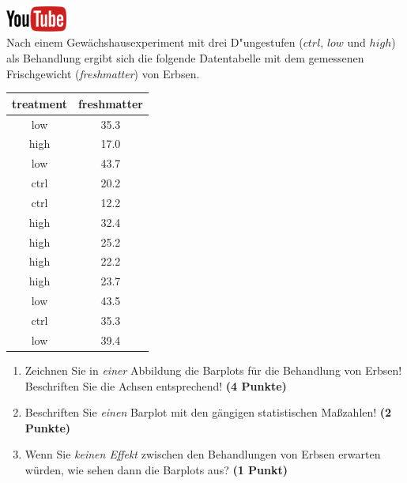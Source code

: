 \documentclass[a4paper, 10pt]{scrartcl}\usepackage[]{graphicx}\usepackage[]{xcolor}
\begin{document}
\hfill\href{https://youtu.be/vXnLttRL_VI}{\includegraphics[width =
  2cm]{img/youtube}}\\[1Ex]



Nach einem Gew{\"a}chshausexperiment mit drei D{"u}ngestufen ($ctrl$, $low$ und $high$) als Behandlung 
ergibt sich die folgende Datentabelle mit dem gemessenen Frischgewicht
(\textit{freshmatter}) von Erbsen.

\begin{table}[!h]
\centering
\begin{tabular}{cc}
\toprule
treatment & freshmatter\\
\midrule
low & 35.3\\
high & 17.0\\
low & 43.7\\
ctrl & 20.2\\
ctrl & 12.2\\
\addlinespace
high & 32.4\\
high & 25.2\\
high & 22.2\\
high & 23.7\\
low & 43.5\\
\addlinespace
ctrl & 35.3\\
low & 39.4\\
\bottomrule
\end{tabular}
\end{table}



\begin{enumerate}
\item Zeichnen Sie in \textit{einer} Abbildung die Barplots f{\"u}r die
  Behandlung von Erbsen! Beschriften Sie die Achsen entsprechend!
  \textbf{(4 Punkte)}
\item Beschriften Sie \textit{einen} Barplot mit den g{\"a}ngigen
  statistischen Ma{\ss}zahlen! \textbf{(2 Punkte)}
\item Wenn Sie \textit{keinen Effekt} zwischen den Behandlungen von
  Erbsen erwarten w{\"u}rden, wie sehen dann die Barplots aus?
  \textbf{(1 Punkt)}
\end{enumerate} 
\clearpage
\end{document}
